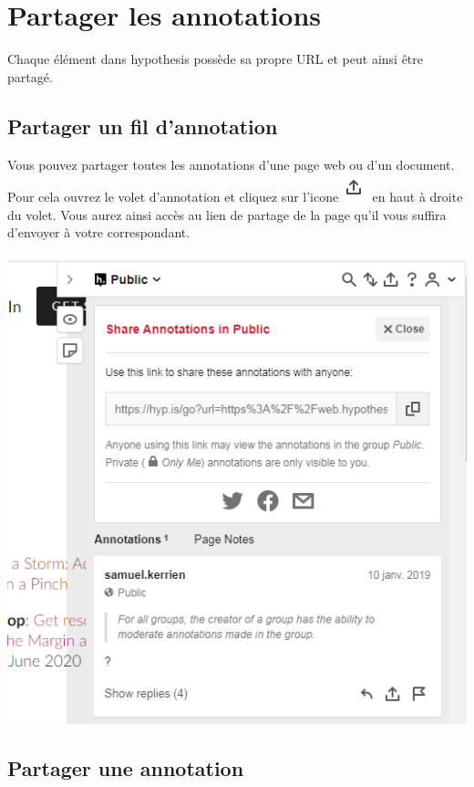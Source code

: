 \documentclass[
]{book}
\begin{document}
\hypertarget{s4}{%
\chapter{Partager les annotations}\label{s4}}

Chaque élément dans hypothesis possède sa propre URL et peut ainsi être partagé.

\hypertarget{s41}{%
\section{Partager un fil d'annotation}\label{s41}}

Vous pouvez partager toutes les annotations d'une page web ou d'un document. Pour cela ouvrez le volet d'annotation et cliquez sur l'icone \includegraphics{img/9ed8e6410bcd25e02923bf774a7fb2fe.png} en haut à droite du volet. Vous aurez ainsi accès au lien de partage de la page qu'il vous suffira d'envoyer à votre correspondant.

\includegraphics{img/cdbebac10f9bd02f38ed117c1ab8e322.png}

\hypertarget{s42}{%
\section{Partager une annotation}\label{s42}}
\end{document}
